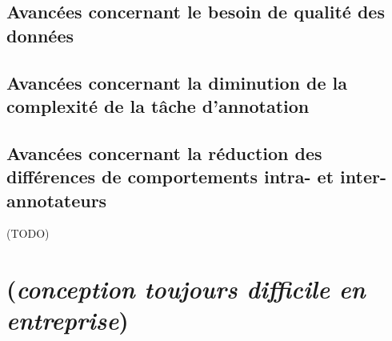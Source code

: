 		
		\subsection{Avancées concernant le besoin de qualité des données}
		\label{section:2.4.1-AVANCEES-ANNOTATION-ASPECT-DONNEES}
		
		
		\subsection{Avancées concernant la diminution de la complexité de la tâche d'annotation}
		\label{section:2.4.2-AVANCEES-ANNOTATION-ASPECT-COMPLEXITE}
		
		
		\subsection{Avancées concernant la réduction des différences de comportements intra- et inter-annotateurs}
		\label{section:2.4.3-AVANCEES-ANNOTATION-ASPECT-HUMAIN}
		
		
		\begin{leftBarSummary}
			\begin{todolist}
				\item[\itemok] (TODO)
			\end{todolist}
		\end{leftBarSummary}

    \section{(\textit{conception toujours difficile en entreprise})}
	\label{section:2.5-RETOUR-EXPERIENCES-INDUSTRIELLES}
